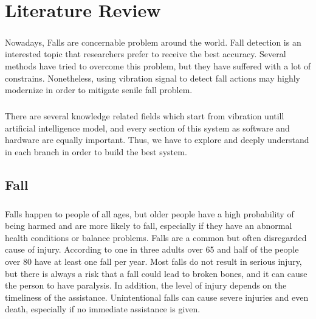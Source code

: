 \setlength{\parindent}{0in} 
\setlength{\parskip}{1em}
\setlength{\baselineskip}{1.6em}


\chapter{Literature Review} 
\label{ch:literature-review}

\paragraph{}
Nowadays, Falls are concernable problem around the world. Fall detection is an interested topic that researchers prefer to receive the best accuracy. Several methods have tried to overcome this problem, but they have suffered with a lot of constrains. Nonetheless, using vibration signal to detect fall actions may highly modernize in order to mitigate senile fall problem.

\paragraph{}
There are several knowledge related fields which start from vibration untill artificial intelligence model, and every section of this system as software and hardware are equally important. Thus, we have to explore and deeply understand in each branch in order to build the best system.


\section{Fall}
\label{Fall}
\paragraph{}
Falls happen to people of all ages, but older people have a high probability of being  harmed and are more likely to fall, especially if they have an abnormal health conditions or balance problems. Falls are a common but often disregarded cause of injury. According to \citeauthor{nhs_2019} \citeyear{nhs_2019} one in three adults over 65 and half of the people over 80 have at least one fall per year. Most falls do not result in serious injury, but there is always a risk that a fall could lead to broken bones, and it can cause the person to have paralysis. In addition, the level of injury depends on the timeliness of the assistance. Unintentional falls can cause severe injuries and even death, especially if no immediate assistance is given.

